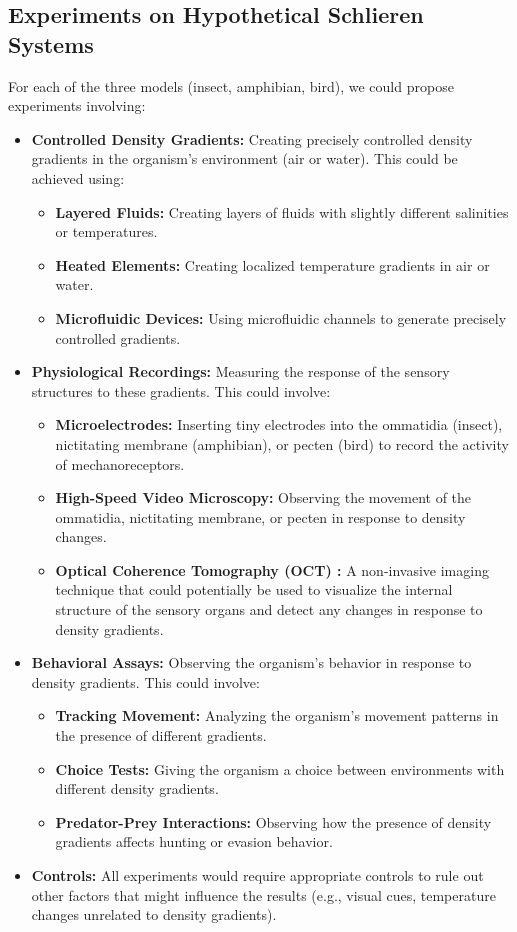 \documentclass[11pt]{article}
\begin{document}
\subsection{Experiments on Hypothetical Schlieren Systems}

For each of the three models (insect, amphibian, bird), we could propose experiments involving:
\begin{itemize}
    \item \textbf{Controlled Density Gradients:} Creating precisely controlled density gradients in the organism's environment (air or water). This could be achieved using:
    \begin{itemize}
        \item \textbf{Layered Fluids:} Creating layers of fluids with slightly different salinities or temperatures.
        \item \textbf{Heated Elements:} Creating localized temperature gradients in air or water.
        \item \textbf{Microfluidic Devices:} Using microfluidic channels to generate precisely controlled gradients.
    \end{itemize}
    \item \textbf{Physiological Recordings:} Measuring the response of the sensory structures to these gradients. This could involve:
    \begin{itemize}
        \item \textbf{Microelectrodes:} Inserting tiny electrodes into the ommatidia (insect), nictitating membrane (amphibian), or pecten (bird) to record the activity of mechanoreceptors.
        \item \textbf{High-Speed Video Microscopy:} Observing the movement of the ommatidia, nictitating membrane, or pecten in response to density changes.
        \item \textbf{Optical Coherence Tomography (OCT) \cite{Huang1991OCT}:} A non-invasive imaging technique that could potentially be used to visualize the internal structure of the sensory organs and detect any changes in response to density gradients.
    \end{itemize}
    \item \textbf{Behavioral Assays:} Observing the organism's behavior in response to density gradients. This could involve:
    \begin{itemize}
        \item \textbf{Tracking Movement:} Analyzing the organism's movement patterns in the presence of different gradients.
        \item \textbf{Choice Tests:} Giving the organism a choice between environments with different density gradients.
        \item \textbf{Predator-Prey Interactions:} Observing how the presence of density gradients affects hunting or evasion behavior.
    \end{itemize}
    \item \textbf{Controls:} All experiments would require appropriate controls to rule out other factors that might influence the results (e.g., visual cues, temperature changes unrelated to density gradients).
\end{itemize}
\end{document}
